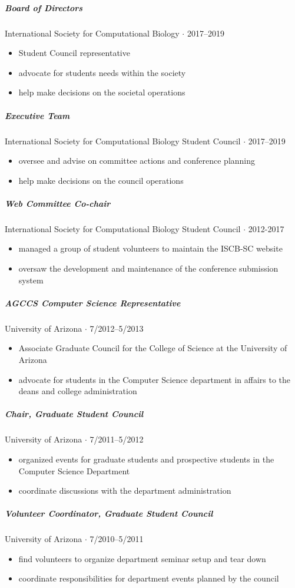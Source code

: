 \documentclass[10pt,letterpaper]{article}
\newcommand{\bigdot}{$\cdot$\xspace}
\begin{document}
\subparagraph{Board of Directors}
International Society for Computational Biology  \bigdot 2017--2019
\begin{itemize}
    \item Student Council representative 
    \item advocate for students needs within the society
    \item help make decisions on the societal operations
\end{itemize}

\subparagraph{Executive Team}
International Society for Computational Biology Student Council \bigdot 2017--2019
\begin{itemize} 
    \item oversee and advise on committee actions and conference planning 
    \item help make decisions on the council operations
\end{itemize}

\subparagraph{Web Committee Co-chair}
International Society for Computational Biology Student Council  \bigdot 2012-2017
\begin{itemize}
    \item managed a group of student volunteers to maintain the ISCB-SC website
    \item oversaw the development and maintenance of the conference submission system
\end{itemize}

\subparagraph{AGCCS Computer Science Representative}
University of Arizona \bigdot 7/2012--5/2013
\begin{itemize}
    \item Associate Graduate Council for the College of Science at the University of Arizona
    \item advocate for students in the Computer Science department in affairs to the deans and college administration
\end{itemize}

\subparagraph{Chair, Graduate Student Council}
University of Arizona \bigdot 7/2011--5/2012
\begin{itemize}
    \item organized events for graduate students and prospective students in the Computer Science Department
    \item coordinate discussions with the department administration
\end{itemize}

\subparagraph{Volunteer Coordinator, Graduate Student Council}
University of Arizona \bigdot 7/2010--5/2011
\begin{itemize}
    \item find volunteers to organize department seminar setup and tear down
    \item coordinate responsibilities for department events planned by the council
\end{itemize}
\end{document}
